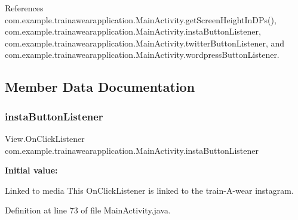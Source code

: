 References com.\+example.\+trainawearapplication.\+Main\+Activity.\+get\+Screen\+Height\+In\+D\+Ps(), com.\+example.\+trainawearapplication.\+Main\+Activity.\+insta\+Button\+Listener, com.\+example.\+trainawearapplication.\+Main\+Activity.\+twitter\+Button\+Listener, and com.\+example.\+trainawearapplication.\+Main\+Activity.\+wordpress\+Button\+Listener.



\subsection{Member Data Documentation}
\mbox{\label{classcom_1_1example_1_1trainawearapplication_1_1_main_activity_a46b1c1063fc63c8850150682ceef4d5b}} 
\subsubsection{\texorpdfstring{instaButtonListener}{instaButtonListener}}
{\footnotesize\ttfamily View.\+On\+Click\+Listener com.\+example.\+trainawearapplication.\+Main\+Activity.\+insta\+Button\+Listener\hspace{0.3cm}{\ttfamily [private]}}

{\bfseries Initial value\+:}
\begin{DoxyCode}{0}
\DoxyCodeLine{        \}}
\DoxyCodeLine{    \}}

\end{DoxyCode}


Linked to media This On\+Click\+Listener is linked to the train-\/\+A-\/wear instagram. 



Definition at line 73 of file Main\+Activity.\+java.



